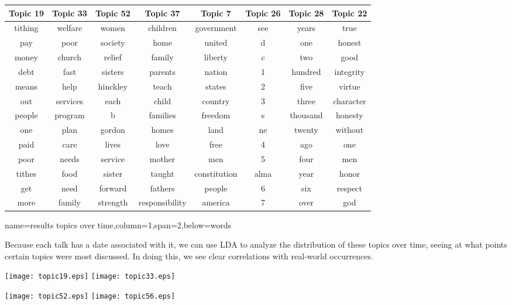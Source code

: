 \documentclass[landscape,final]{baposter}
\begin{document}
\begin{poster}
{	\begin{center}
	  \begin{tabular}{cccccccc}
		Topic 19&Topic 33&Topic 52&Topic 37&Topic 7&Topic 26&Topic 28&Topic 22\\
		\hline
		tithing&welfare&women&children&government&see&years&true \\
		pay&poor&society&home&united&d&one&honest \\
		money&church&relief&family&liberty&c&two&good \\
		debt&fast&sisters&parents&nation&1&hundred&integrity \\
		means&help&hinckley&teach&states&2&five&virtue \\
		out&services&each&child&country&3&three&character \\
		people&program&b&families&freedom&s&thousand&honesty \\
		one&plan&gordon&homes&land&ne&twenty&without \\
		paid&care&lives&love&free&4&ago&one \\
		poor&needs&service&mother&men&5&four&men \\
		tithes&food&sister&taught&constitution&alma&year&honor \\
		get&need&forward&fathers&people&6&six&respect \\
		more&family&strength&responsibility&america&7&over&god \\
	  \end{tabular}
	\end{center}

  }

  {name=results topics over time,column=1,span=2,below=words}{

	Because each talk has a date associated with it, we can use LDA to analyze
	the distribution of these topics over time, seeing at what points certain
	topics were most discussed.  In doing this, we see clear correlations with
	real-world occurrences.

	\begin{center}
	  \texttt{[image: topic19.eps]}
	  \texttt{[image: topic33.eps]}

	  \texttt{[image: topic52.eps]}
	  \texttt{[image: topic56.eps]}
	\end{center}

  }


\end{poster}
\end{document}
